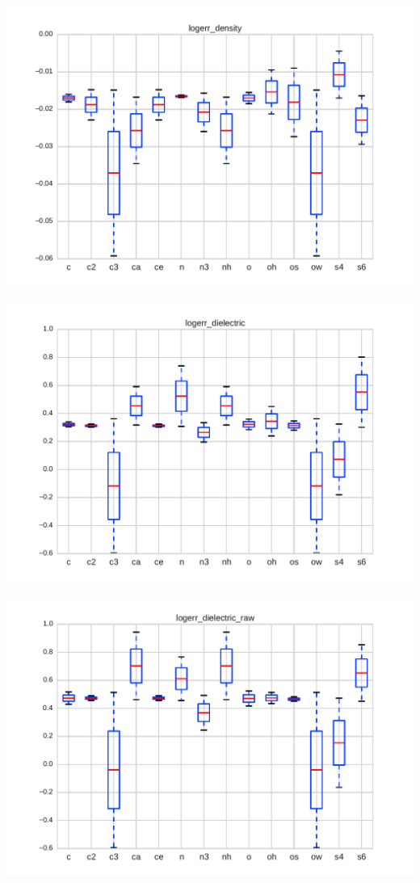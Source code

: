 \documentclass[journal=jacsat,manuscript=article]{achemso}
\begin{document}
\includegraphics[width=\columnwidth]{./figures/functional_group_logerr_density.pdf}

\includegraphics[width=\columnwidth]{./figures/functional_group_logerr_dielectric.pdf}

\includegraphics[width=\columnwidth]{./figures/functional_group_logerr_dielectric_raw.pdf}
\end{document}
